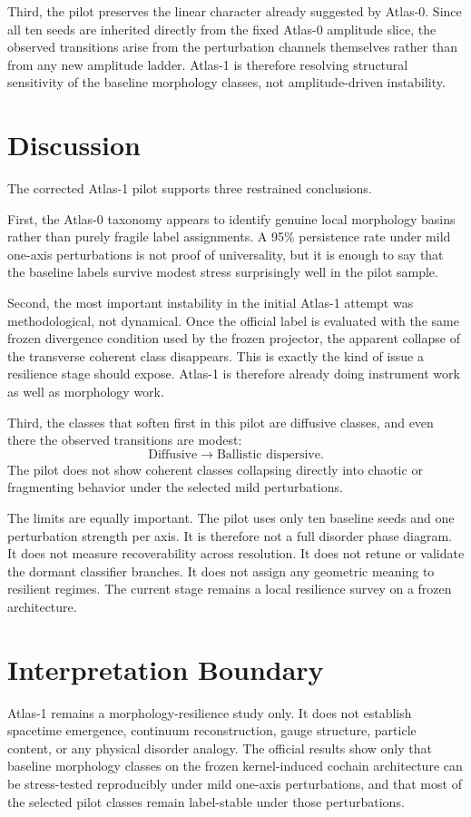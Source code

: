\documentclass[11pt]{article}
\begin{document}
Third, the pilot preserves the linear character already suggested by Atlas-0. Since all ten seeds are inherited directly from the fixed Atlas-0 amplitude slice, the observed transitions arise from the perturbation channels themselves rather than from any new amplitude ladder. Atlas-1 is therefore resolving structural sensitivity of the baseline morphology classes, not amplitude-driven instability.

\section{Discussion}
The corrected Atlas-1 pilot supports three restrained conclusions.

First, the Atlas-0 taxonomy appears to identify genuine local morphology basins rather than purely fragile label assignments. A 95\% persistence rate under mild one-axis perturbations is not proof of universality, but it is enough to say that the baseline labels survive modest stress surprisingly well in the pilot sample.

Second, the most important instability in the initial Atlas-1 attempt was methodological, not dynamical. Once the official label is evaluated with the same frozen divergence condition used by the frozen projector, the apparent collapse of the transverse coherent class disappears. This is exactly the kind of issue a resilience stage should expose. Atlas-1 is therefore already doing instrument work as well as morphology work.

Third, the classes that soften first in this pilot are diffusive classes, and even there the observed transitions are modest:
\begin{equation}
\text{Diffusive} \rightarrow \text{Ballistic dispersive}.
\end{equation}
The pilot does not show coherent classes collapsing directly into chaotic or fragmenting behavior under the selected mild perturbations.

The limits are equally important. The pilot uses only ten baseline seeds and one perturbation strength per axis. It is therefore not a full disorder phase diagram. It does not measure recoverability across resolution. It does not retune or validate the dormant classifier branches. It does not assign any geometric meaning to resilient regimes. The current stage remains a local resilience survey on a frozen architecture.

\section{Interpretation Boundary}
Atlas-1 remains a morphology-resilience study only. It does not establish spacetime emergence, continuum reconstruction, gauge structure, particle content, or any physical disorder analogy. The official results show only that baseline morphology classes on the frozen kernel-induced cochain architecture can be stress-tested reproducibly under mild one-axis perturbations, and that most of the selected pilot classes remain label-stable under those perturbations.
\end{document}
